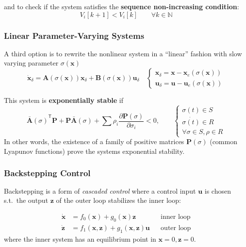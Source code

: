 and to check if the system satisfies the \textbf{sequence non-increasing condition}:
\noindent\begin{equation*}
    V_i[k+1] < V_i[k] \qquad \forall k \in \mathbb{N}
\end{equation*}

\subsubsection{Linear Parameter-Varying Systems}
A third option is to rewrite the nonlinear system in a ``linear'' fashion with slow varying parameter $\sigma(\mathbf{x})$
\noindent\begin{equation*}
    \dot{\mathbf{x}}_\delta = \mathbf{A} (\sigma(\mathbf{x}))\mathbf{x}_\delta + \mathbf{B}(\sigma(\mathbf{x}))\mathbf{u}_\delta\quad
    \begin{cases}
        \mathbf{x}_\delta = \mathbf{x}-\mathbf{x}_e(\sigma(\mathbf{x})) \\
        \mathbf{u}_\delta = \mathbf{u}-\mathbf{u}_e(\sigma(\mathbf{x}))
    \end{cases}
\end{equation*}

This system is \textbf{exponentially stable} if
\noindent\begin{equation*}
    {\bar{\mathbf{A}}(\sigma)}^{\mathsf{T}} \mathbf{P} + \mathbf{P}\bar{\mathbf{A}}(\sigma) + \sum \rho_i \frac{\partial \mathbf{P}(\sigma)}{\partial \sigma_i} < 0,\qquad
    \begin{cases}
        \sigma(t)\in S       \\
        \dot{\sigma(t)}\in R \\
        \forall \sigma\in S, \rho\in R
    \end{cases}
\end{equation*}
In other words, the existence of a family of positive matrices $\mathbf{P}(\sigma)$ (common Lyapunov functions) prove the systems exponential stability.

\subsubsection{Backstepping Control}
Backstepping is a form of \textit{cascaded control} where a control input $\mathbf{u}$ is chosen s.t.\ the output $\mathbf{z}$ of the outer loop stabilizes the inner loop:

\noindent\begin{align*}
    \dot{\mathbf{x}} & = f_0(\mathbf{x}) + g_0(\mathbf{x})\mathbf{z}                         &  & \text{inner loop} \\
    \dot{\mathbf{z}} & = f_1(\mathbf{x},\mathbf{z}) + g_1(\mathbf{x}, \mathbf{z}) \mathbf{u} &  & \text{outer loop}
\end{align*}
where the inner system has an equilibrium point in $\mathbf{x}=0, \mathbf{z}=0$.

